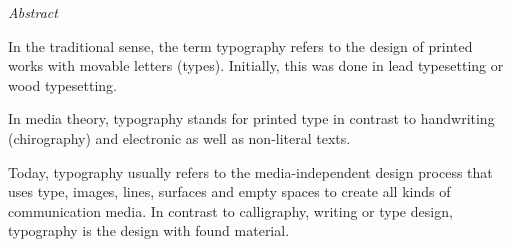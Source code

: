 
{\normalfont
\color{uniblau}
\huge\sffamily\itshape
Abstract
}


In the traditional sense, the term typography refers to the design of printed works with movable letters (types). Initially, this was done in lead typesetting or wood typesetting.

In media theory, typography stands for printed type in contrast to handwriting (chirography) and electronic as well as non-literal texts.

Today, typography usually refers to the media-independent design process that uses type, images, lines, surfaces and empty spaces to create all kinds of communication media. In contrast to calligraphy, writing or type design, typography is the design with found material.



\vfill